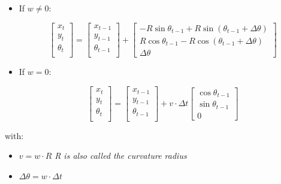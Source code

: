 \documentclass[11pt]{article}
\providecommand{\tightlist}{%
      \setlength{\itemsep}{0pt}\setlength{\parskip}{0pt}}
\begin{document}
\begin{itemize}
\item
  If \(w \neq 0\):

  \[
        \begin{bmatrix}
        x_t \\
        y_t \\
        \theta_t \\ 
        \end{bmatrix} 
        = 
        \begin{bmatrix}
        x_{t-1} \\
        y_{t-1} \\
        \theta_{t-1} \\ 
        \end{bmatrix} 
        +
        \begin{bmatrix}
            -R \sin \theta_{t-1} + R \sin(\theta_{t-1} + \Delta \theta) \\ 
            R \cos \theta_{t-1} - R \cos(\theta_{t-1} + \Delta \theta)\\
            \Delta \theta
        \end{bmatrix}
    \]
\item
  If \(w = 0\):

  \[
       \begin{bmatrix}
        x_t \\
        y_t \\
        \theta_t \\ 
        \end{bmatrix} 
        = 
        \begin{bmatrix}
        x_{t-1} \\
        y_{t-1} \\
        \theta_{t-1} \\ 
        \end{bmatrix} 
        + v \cdot \Delta t
        \begin{bmatrix}
            \cos \theta_{t-1} \\ \sin \theta_{t-1} \\ 0
        \end{bmatrix}
    \]
\end{itemize}

with:

\begin{itemize}
\tightlist
\item
  \(v = w \cdot R\) \emph{R is also called the curvature radius}
\item
  \(\Delta \theta = w \cdot \Delta t\)
\end{itemize}
\end{document}
